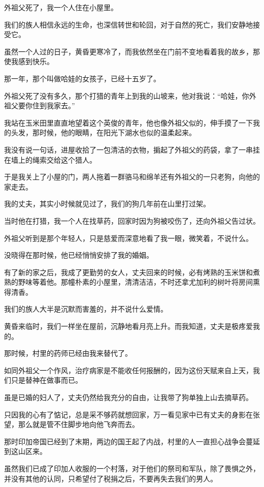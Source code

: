 \par 外祖父死了，我一个人住在小屋里。
\par 我们的族人相信永远的生命，也深信转世和轮回，对于自然的死亡，我们安静地接受它。
\par 虽然一个人过的日子，黄昏更寒冷了，而我依然坐在门前不变地看着我的故乡，那使我感到快乐。
\par 那一年，那个叫做哈娃的女孩子，已经十五岁了。
\par 外祖父死了没有多久，那个打猎的青年上到我的山坡来，他对我说：“哈娃，你外祖父要你住到我家去。”
\par 我站在玉米田里直直地望着这个英俊的青年，他也像外祖父似的，伸手摸了一下我的头发，那时候，他的眼睛，在阳光下湖水也似的温柔起来。
\par 我没有说一句话，进屋收拾了一包清洁的衣物，掮起了外祖父的药袋，拿了一串挂在墙上的绳索交给这个猎人。
\par 于是我关上了小屋的门，两人拖着一群骆马和绵羊还有外祖父的一只老狗，向他的家走去。
\par 我的丈夫，其实小时候就见过了，我们的狗几年前在山里打过架。
\par 当时他在打猎，我一个人在找草药，回家时因为狗被咬伤了，还向外祖父告过状。
\par 外祖父听到是那个年轻人，只是慈爱而深意地看了我一眼，微笑着，不说什么。
\par 没晓得在那时候，他已经悄悄安排了我的婚姻。
\par 有了新的家之后，我成了更勤劳的女人，丈夫回来的时候，必有烤熟的玉米饼和煮熟的野味等着他。那幢朴素的小屋里，清清洁洁，不时还拿尤加利的树叶将房间熏得清香。
\par 我们的族人大半是沉默而害羞的，并不说什么爱情。
\par 黄昏来临时，我们一样坐在屋前，沉静地看月亮上升。而我知道，丈夫是极疼爱我的。
\par 那时候，村里的药师已经由我来替代了。
\par 如同外祖父一个作风，治疗病家是不能收任何报酬的，因为这份天赋来自上天，我们只是替神在做事而已。
\par 虽是已婚的妇人了，丈夫仍然给我充分的自由，让我带了狗单独上山去摘草药。
\par 只因我的心有了惦记，总是采不够药就想回家，万一看见家中已有丈夫的身影在张望，那么就是管不住脚步地向他飞奔而去。
\par 那时印加帝国已经到了末期，两边的国王起了内战，村里的人一直担心战争会蔓延到这山区来。
\par 虽然我们已成了印加人收服的一个村落，对于他们的祭司和军队，除了畏惧之外，并没有其他的认同，只希望付了税捐之后，不要再失去我们的男人。
